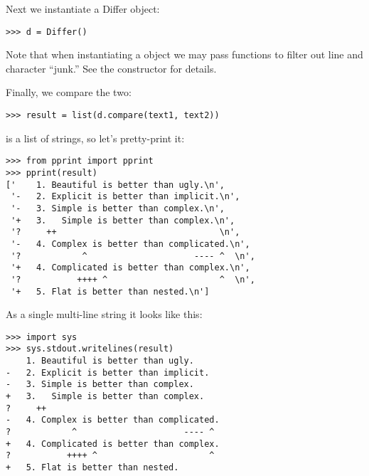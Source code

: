 Next we instantiate a Differ object:

\begin{verbatim}
>>> d = Differ()
\end{verbatim}

Note that when instantiating a  object we may pass
functions to filter out line and character ``junk.''  See the
 constructor for details.

Finally, we compare the two:

\begin{verbatim}
>>> result = list(d.compare(text1, text2))
\end{verbatim}

 is a list of strings, so let's pretty-print it:

\begin{verbatim}
>>> from pprint import pprint
>>> pprint(result)
['    1. Beautiful is better than ugly.\n',
 '-   2. Explicit is better than implicit.\n',
 '-   3. Simple is better than complex.\n',
 '+   3.   Simple is better than complex.\n',
 '?     ++                                \n',
 '-   4. Complex is better than complicated.\n',
 '?            ^                     ---- ^  \n',
 '+   4. Complicated is better than complex.\n',
 '?           ++++ ^                      ^  \n',
 '+   5. Flat is better than nested.\n']
\end{verbatim}

As a single multi-line string it looks like this:

\begin{verbatim}
>>> import sys
>>> sys.stdout.writelines(result)
    1. Beautiful is better than ugly.
-   2. Explicit is better than implicit.
-   3. Simple is better than complex.
+   3.   Simple is better than complex.
?     ++
-   4. Complex is better than complicated.
?            ^                     ---- ^
+   4. Complicated is better than complex.
?           ++++ ^                      ^
+   5. Flat is better than nested.
\end{verbatim}
